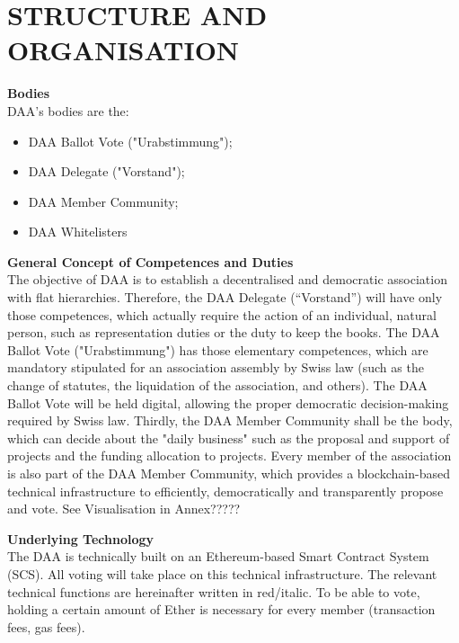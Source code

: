\section{STRUCTURE AND ORGANISATION}

\item \textbf{Bodies} \\
DAA's bodies are the:
\begin{itemize}
    \item DAA Ballot Vote ("Urabstimmung");
    \item DAA Delegate ("Vorstand");
    \item DAA Member Community;
    \item DAA Whitelisters
\end{itemize}

\item \textbf{General Concept of Competences and Duties} \\
The objective of DAA is to establish a decentralised and democratic association with flat hierarchies.
Therefore, the DAA Delegate (“Vorstand”) will have only those competences, which actually require the action of an individual, natural person, such as representation duties or the duty to keep the books.
The DAA Ballot Vote ("Urabstimmung") has those elementary competences, which are mandatory stipulated for an association assembly by Swiss law (such as the change of statutes, the liquidation of the association, and others).
The DAA Ballot Vote will be held digital, allowing the proper democratic decision-making required by Swiss law.
Thirdly, the DAA Member Community shall be the body, which can decide about the "daily business" such as the proposal and support of projects and the funding allocation to projects.
Every member of the association is also part of the DAA Member Community, which provides a blockchain-based technical infrastructure to efficiently, democratically and transparently propose and vote.
See Visualisation in Annex?????

\item \textbf{Underlying Technology} \\
The DAA is technically built on an Ethereum-based Smart Contract System (SCS).
All voting will take place on this technical infrastructure.
The relevant technical functions are hereinafter written in red/italic.
To be able to vote, holding a certain amount of Ether is necessary for every member (transaction fees, gas fees).

